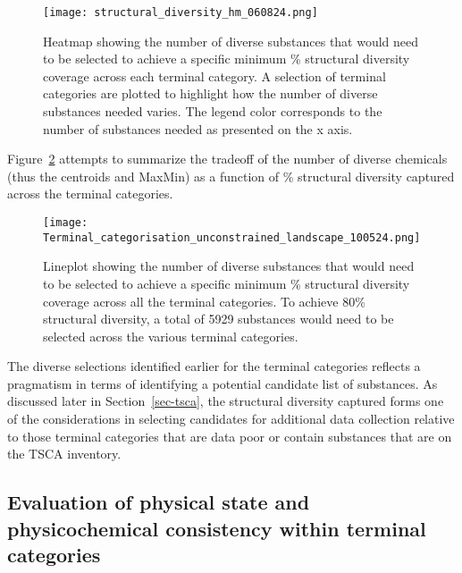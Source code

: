 \documentclass[
  super,
  preprint,
  3p]{elsarticle}
\begin{document}
\begin{figure}

{\centering \texttt{[image: structural\_diversity\_hm\_060824.png]}

}

\caption{\label{fig-structdiv-hm}Heatmap showing the number of diverse
substances that would need to be selected to achieve a specific minimum
\% structural diversity coverage across each terminal category. A
selection of terminal categories are plotted to highlight how the number
of diverse substances needed varies. The legend color corresponds to the
number of substances needed as presented on the x axis.}

\end{figure}

Figure~\ref{fig-structdiv-corr} attempts to summarize the tradeoff of
the number of diverse chemicals (thus the centroids and MaxMin) as a
function of \% structural diversity captured across the terminal
categories.

\begin{figure}

{\centering \texttt{[image: Terminal\_categorisation\_unconstrained\_landscape\_100524.png]}

}

\caption{\label{fig-structdiv-corr}Lineplot showing the number of
diverse substances that would need to be selected to achieve a specific
minimum \% structural diversity coverage across all the terminal
categories. To achieve 80\% structural diversity, a total of 5929
substances would need to be selected across the various terminal
categories.}

\end{figure}

The diverse selections identified earlier for the terminal categories
reflects a pragmatism in terms of identifying a potential candidate list
of substances. As discussed later in Section~\ref{sec-tsca}, the
structural diversity captured forms one of the considerations in
selecting candidates for additional data collection relative to those
terminal categories that are data poor or contain substances that are on
the TSCA inventory.

\hypertarget{sec-physchem}{%
\subsection{Evaluation of physical state and physicochemical consistency
within terminal categories}\label{sec-physchem}}
\end{document}
